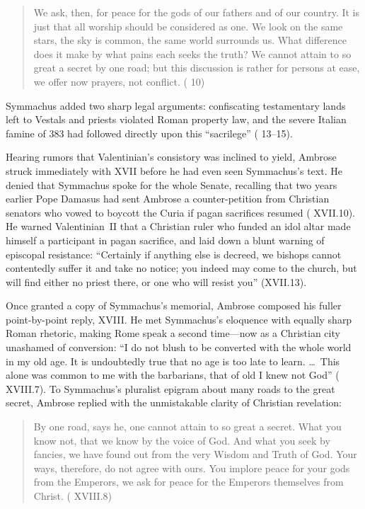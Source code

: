 \begin{quote}
We ask, then, for peace for the gods of our fathers and of our country. It is just that all worship should be considered as one. We look on the same stars, the sky is common, the same world surrounds us. What difference does it make by what pains each seeks the truth? We cannot attain to so great a secret by one road; but this discussion is rather for persons at ease, we offer now prayers, not conflict. ( 10)
\end{quote}

Symmachus added two sharp legal arguments: confiscating testamentary lands left to Vestals and priests violated Roman property law, and the severe Italian famine of 383 had followed directly upon this ``sacrilege'' ( 13--15).

Hearing rumors that Valentinian's consistory was inclined to yield, Ambrose struck immediately with  XVII before he had even seen Symmachus's text. He denied that Symmachus spoke for the whole Senate, recalling that two years earlier Pope Damasus had sent Ambrose a counter-petition from Christian senators who vowed to boycott the Curia if pagan sacrifices resumed ( XVII.10). He warned Valentinian~II that a Christian ruler who funded an idol altar made himself a participant in pagan sacrifice, and laid down a blunt warning of episcopal resistance: ``Certainly if anything else is decreed, we bishops cannot contentedly suffer it and take no notice; you indeed may come to the church, but will find either no priest there, or one who will resist you'' (XVII.13).

Once granted a copy of Symmachus's memorial, Ambrose composed his fuller point-by-point reply,  XVIII. He met Symmachus's eloquence with equally sharp Roman rhetoric, making Rome speak a second time---now as a Christian city unashamed of conversion: ``I do not blush to be converted with the whole world in my old age. It is undoubtedly true that no age is too late to learn. \ldots\ This alone was common to me with the barbarians, that of old I knew not God'' ( XVIII.7). To Symmachus's pluralist epigram about many roads to the great secret, Ambrose replied with the unmistakable clarity of Christian revelation:

\begin{quote}
By one road, says he, one cannot attain to so great a secret. What you know not, that we know by the voice of God. And what you seek by fancies, we have found out from the very Wisdom and Truth of God. Your ways, therefore, do not agree with ours. You implore peace for your gods from the Emperors, we ask for peace for the Emperors themselves from Christ. ( XVIII.8)
\end{quote}

